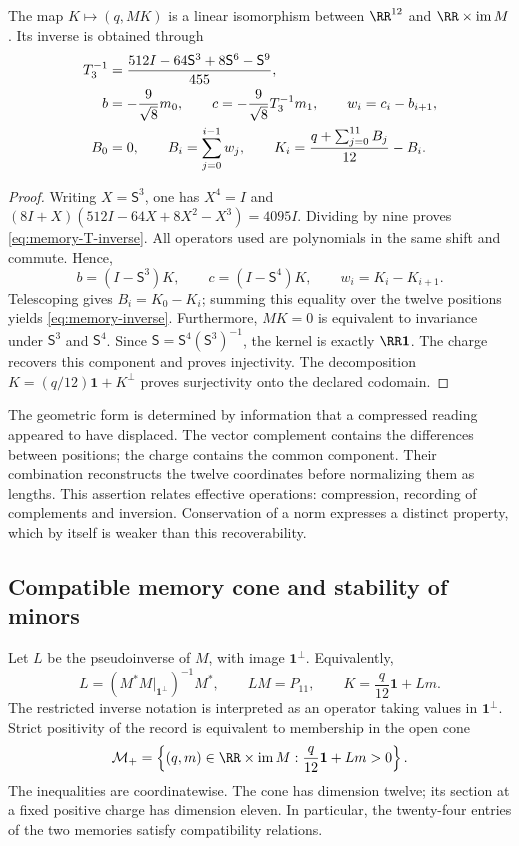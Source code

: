 \begin{theorem}
\label{thm:memory-inversion}
The map \(K\mapsto(q,MK)\) is a linear isomorphism between
\(\RR^{12}\) and \(\RR\times\operatorname{im}M\). Its inverse is obtained
through
\begin{align}
 T_3^{-1}&=\frac{512I-64\mathsf S^3+8\mathsf S^6-\mathsf S^9}{455},
 \label{eq:memory-T-inverse}\\
 b&=-\frac9{\sqrt8}m_0,\qquad
 c=-\frac9{\sqrt8}T_3^{-1}m_1,\qquad w_i=c_i-b_{i+1},\notag\\
 B_0&=0,\qquad B_i=\sum_{j=0}^{i-1}w_j,\qquad
 K_i=\frac{q+\sum_{j=0}^{11}B_j}{12}-B_i.
 \label{eq:memory-inverse}
\end{align}
\end{theorem}
\begin{proof}
Writing \(X=\mathsf S^3\), one has \(X^4=I\) and
\((8I+X)(512I-64X+8X^2-X^3)=4095I\). Dividing by nine
proves \eqref{eq:memory-T-inverse}. All operators used are
polynomials in the same shift and commute. Hence,
\[
 b=(I-\mathsf S^3)K,\qquad c=(I-\mathsf S^4)K,
 \qquad w_i=K_i-K_{i+1}.
\]
Telescoping gives \(B_i=K_0-K_i\); summing this equality over
the twelve positions yields \eqref{eq:memory-inverse}. Furthermore,
\(MK=0\) is equivalent to invariance under \(\mathsf S^3\) and
\(\mathsf S^4\). Since \(\mathsf S=\mathsf S^4(\mathsf S^3)^{-1}\),
the kernel is exactly \(\RR\mathbf1\). The charge recovers this
component and proves injectivity. The decomposition
\(K=(q/12)\mathbf1+K^\perp\) proves surjectivity onto the
declared codomain.
\end{proof}

The geometric form is determined by information that a compressed
reading appeared to have displaced. The vector complement contains the
differences between positions; the charge contains the common component. Their
combination reconstructs the twelve coordinates before normalizing them as
lengths. This assertion relates effective operations: compression,
recording of complements and inversion. Conservation of a norm expresses
a distinct property, which by itself is weaker than this recoverability.

\subsection{Compatible memory cone and stability of minors}

Let \(L\) be the pseudoinverse of \(M\), with image
\(\mathbf1^\perp\). Equivalently,
\[
 L=\left(M^*M\big|_{\mathbf1^\perp}\right)^{-1}M^*,
 \qquad LM=P_{11},\qquad K=\frac q{12}\mathbf1+Lm.
\]
The restricted inverse notation is interpreted as an operator taking
values in \(\mathbf1^\perp\). Strict positivity of the record
is equivalent to membership in the open cone
\begin{equation}
 \mathcal M_+=\left\{(q,m)\in\RR\times\operatorname{im}M:
 \frac q{12}\mathbf1+Lm>0\right\}.
 \label{eq:memory-positive-cone}
\end{equation}
The inequalities are coordinatewise. The cone has dimension twelve; its section
at a fixed positive charge has dimension eleven. In particular, the twenty-four
entries of the two memories satisfy compatibility relations.

